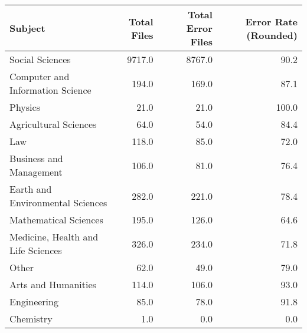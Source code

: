 \begin{tabular}{lrrr}
\toprule
                           Subject &  Total Files &  Total Error Files &  Error Rate (Rounded) \\
\midrule
                   Social Sciences &       9717.0 &             8767.0 &                  90.2 \\
  Computer and Information Science &        194.0 &              169.0 &                  87.1 \\
                           Physics &         21.0 &               21.0 &                 100.0 \\
             Agricultural Sciences &         64.0 &               54.0 &                  84.4 \\
                               Law &        118.0 &               85.0 &                  72.0 \\
           Business and Management &        106.0 &               81.0 &                  76.4 \\
  Earth and Environmental Sciences &        282.0 &              221.0 &                  78.4 \\
             Mathematical Sciences &        195.0 &              126.0 &                  64.6 \\
Medicine, Health and Life Sciences &        326.0 &              234.0 &                  71.8 \\
                             Other &         62.0 &               49.0 &                  79.0 \\
               Arts and Humanities &        114.0 &              106.0 &                  93.0 \\
                       Engineering &         85.0 &               78.0 &                  91.8 \\
                         Chemistry &          1.0 &                0.0 &                   0.0 \\
\bottomrule
\end{tabular}
